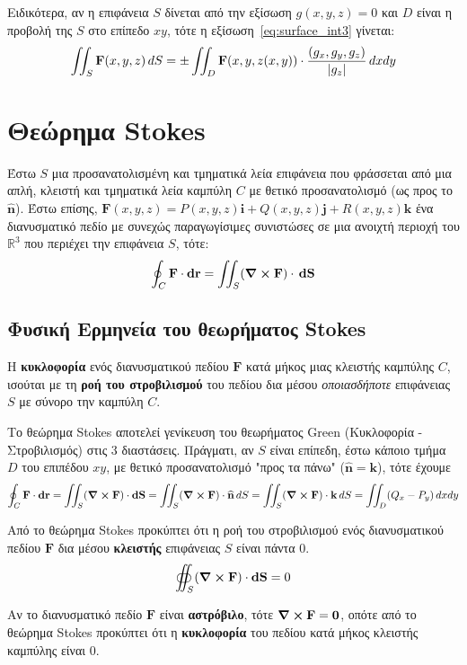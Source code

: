 Ειδικότερα, αν η επιφάνεια $S$ δίνεται από την εξίσωση $ g(x,y,z) = 0 $ και $D$ είναι η
προβολή της $S$ στο επίπεδο $ xy $, τότε η εξίσωση~\eqref{eq:surface_int3} γίνεται:
\[
  \iint_{S} \mathbf{F}(x,y,z) \,{dS} = \pm\iint_{D} \mathbf{F}(x,y,z(x,y)) 
  \cdot \frac{(g_{x},g_{y},g_{z})}{\abs{g_{z}}} \,{dx}{dy} 
\]


\section{Θεώρημα Stokes}

Έστω $S$ μια προσανατολισμένη και τμηματικά λεία επιφάνεια που φράσσεται από μια απλή, 
κλειστή και τμηματικά λεία καμπύλη $C$ με θετικό προσανατολισμό (ως προς το 
$ \mathbf{\widehat{n}} $).  Έστω επίσης, 
$ \mathbf{F}(x,y,z) = P(x,y,z)\mathbf{i}+Q(x,y,z)\mathbf{j}+R(x,y,z)\mathbf{k} $ ένα 
διανυσματικό πεδίο με συνεχώς παραγωγίσιμες συνιστώσες σε μια ανοιχτή περιοχή του 
$ \mathbb{R}^{3} $ που περιέχει την επιφάνεια $S$, τότε:
\[
  \oint_{C} \mathbf{F} \cdot \mathbf{dr} = \iint_{S} (\curl \mathbf{F}) \cdot \,{ \mathbf{dS}} 
\]

\subsection*{Φυσική Ερμηνεία του θεωρήματος Stokes}

Η \textbf{κυκλοφορία} ενός διανυσματικού πεδίου $ \mathbf{F} $ κατά μήκος μιας κλειστής 
καμπύλης $C$, ισούται με τη \textbf{ροή του στροβιλισμού} του πεδίου δια μέσου
\textit{οποιασδήποτε} επιφάνειας $S$ με σύνορο την καμπύλη $C$. 

\begin{rems}
\item {}
  \begin{myitemize}
    \item Το θεώρημα Stokes αποτελεί γενίκευση του θεωρήματος Green (Κυκλοφορία -
      Στροβιλισμός) στις 3 διαστάσεις. 
      Πράγματι, αν $S$ είναι επίπεδη, έστω κάποιο τμήμα $D$ του επιπέδου $ xy $, 
      με θετικό προσανατολισμό "προς τα πάνω" ($ \mathbf{\widehat{n}}= \mathbf{k} $), 
      τότε έχουμε 
      \[
        \oint_{C} \mathbf{F}\cdot {\mathbf{dr}} = \iint_{S} (\curl\mathbf{F}) \cdot
        \mathbf{dS} = \iint_{S} (\curl\mathbf{F}) \cdot \mathbf{\widehat{n}} \,{dS} = 
        \iint_{S} (\curl \mathbf{F}) \cdot \mathbf{k} \,{dS} = 
        \iint_{D} (Q_{x}-P_{y}) \,{dx}{dy}
      \] 
    \item Από το θεώρημα Stokes προκύπτει ότι η ροή του στροβιλισμού ενός διανυσματικού
      πεδίου $ \mathbf{F} $ δια μέσου \textbf{κλειστής} επιφάνειας $S$ είναι πάντα 0.
      \[
        \oiint_{S} (\curl\mathbf{F}) \cdot {\mathbf{dS}} = 0 
      \]
    \item Αν το διανυσματικό πεδίο $ \mathbf{F} $ είναι \textbf{αστρόβιλο}, 
      τότε $ \curl \mathbf{F} = \mathbf{0} $, οπότε από το θεώρημα Stokes προκύπτει ότι 
      η \textbf{κυκλοφορία} του πεδίου κατά μήκος κλειστής καμπύλης είναι 0.
  \end{myitemize}
\end{rems}




